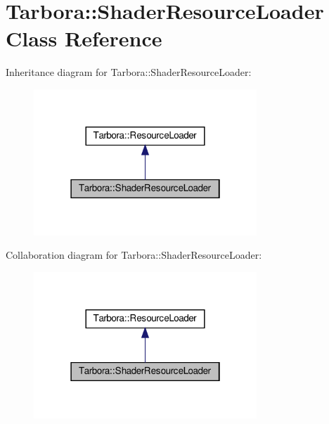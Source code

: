 \hypertarget{classTarbora_1_1ShaderResourceLoader}{}\section{Tarbora\+:\+:Shader\+Resource\+Loader Class Reference}
\label{classTarbora_1_1ShaderResourceLoader}


Inheritance diagram for Tarbora\+:\+:Shader\+Resource\+Loader\+:\nopagebreak
\begin{figure}[H]
\begin{center}
\leavevmode
\includegraphics[width=238pt]{classTarbora_1_1ShaderResourceLoader__inherit__graph}
\end{center}
\end{figure}


Collaboration diagram for Tarbora\+:\+:Shader\+Resource\+Loader\+:\nopagebreak
\begin{figure}[H]
\begin{center}
\leavevmode
\includegraphics[width=238pt]{classTarbora_1_1ShaderResourceLoader__coll__graph}
\end{center}
\end{figure}
